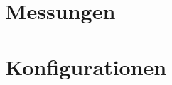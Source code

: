 \appendix

\section{Messungen}
\label{appendix:measures}


\section{Konfigurationen}
\label{appendix:configurations}







%  
% 

